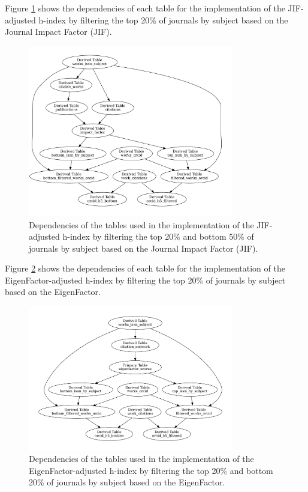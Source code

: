 Figure \ref{fig:tables2} shows the dependencies of each table for the
implementation of the JIF-adjusted h-index by filtering the top 20\% of
journals by subject based on the Journal Impact Factor (JIF).

\begin{figure}[H]
      \centering
      \includegraphics[width=0.8\textwidth]{../figs/impact.pdf}
      \caption{Dependencies of the tables used in the implementation of the JIF-adjusted h-index by filtering the top 20\% and bottom 50\% of journals by subject based on the Journal Impact Factor (JIF).}
      \label{fig:tables2}
\end{figure}

Figure \ref{fig:tables3} shows the dependencies of each table for the
implementation of the EigenFactor-adjusted h-index by filtering the top 20\% of
journals by subject based on the EigenFactor.

\begin{figure}[H]
      \centering
      \includegraphics[width=0.8\textwidth]{../figs/eigenfactor.pdf}
      \caption{Dependencies of the tables used in the implementation of the EigenFactor-adjusted h-index by filtering the top 20\% and bottom 20\% of journals by subject based on the EigenFactor.}
      \label{fig:tables3}
\end{figure}

